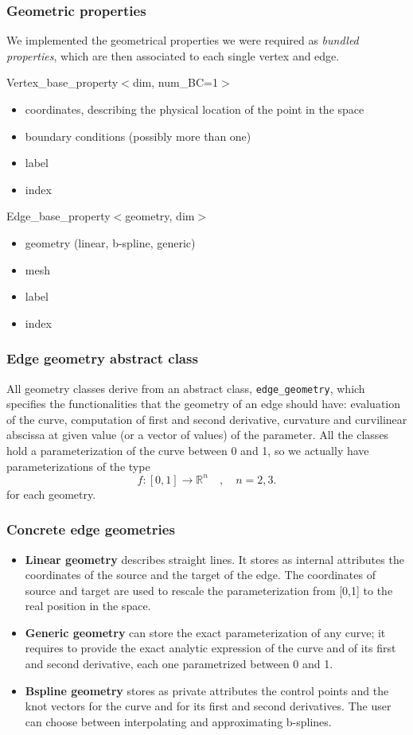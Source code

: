 \documentclass[11pt]{beamer}
\begin{document}
	\begin{frame}
		\frametitle{Geometric properties}
		We implemented the geometrical properties we were required as \textit{bundled properties}, which are then associated to each single vertex and edge.
		\begin{block}{Vertex\_base\_property$<$dim, num\_BC=1$>$}
			\begin{itemize}
				\item coordinates, describing the physical location of the point in the space
				\item boundary conditions (possibly more than one)
				\item label
				\item index
			\end{itemize}
		\end{block}
		\begin{block}{Edge\_base\_property$<$geometry, dim$>$}
			\begin{itemize}
				\item geometry (linear, b-spline, generic)
				\item mesh
				\item label
				\item index
			\end{itemize}
		\end{block}		
	\end{frame}
	\begin{frame}
		\frametitle{Edge geometry abstract class}
		All geometry classes derive from an abstract class, \texttt{edge\_geometry}, which specifies the functionalities that the geometry of an edge should have: evaluation of the curve, computation of first and second derivative, curvature and curvilinear abscissa at given value (or a vector of values) of the parameter. All the classes hold a parameterization of the curve between 0 and 1, so we actually have parameterizations of the type
		\begin{equation*}
		f:[0,1]\rightarrow\mathbb{R}^{n} \quad, \quad n=2,3.
		\end{equation*}
		for each geometry.
	\end{frame}
	\begin{frame}
		\frametitle{Concrete edge geometries}
		\begin{itemize}
			\item \textbf{Linear geometry} describes straight lines. It stores as internal attributes the coordinates of the source and the target of the edge. The coordinates of source and target are used to rescale the parameterization from [0,1] to the real position in the space. 
			\item \textbf{Generic geometry} can store the exact parameterization of any curve; it requires to provide the exact analytic expression of the curve and of its first and second derivative, each one parametrized between 0 and 1.
			\item \textbf{Bspline geometry} stores as private attributes the control points and the knot vectors for the curve and for its first and second derivatives.	
			The user can choose between interpolating and approximating b-splines.
		\end{itemize}
	\end{frame}
\end{document}
